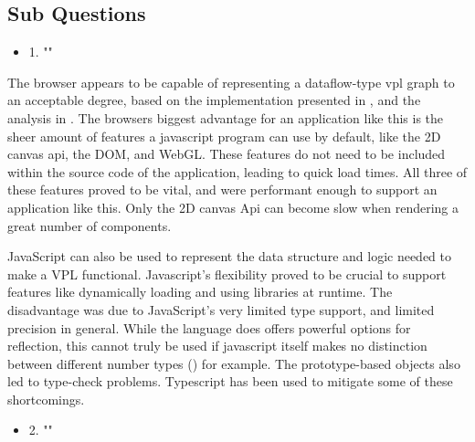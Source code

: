 \subsection*{Sub Questions}

\begin{itemize}[ ]
  \item 1. "\mySubRQOne"
\end{itemize}

The browser appears to be capable of representing a dataflow-type vpl graph to an acceptable degree, 
based on the implementation presented in , and the analysis in .
The browsers biggest advantage for an application like this is the sheer amount of features a javascript program can use by default, like the 2D canvas api, the DOM, and WebGL. 
These features do not need to be included within the source code of the application, leading to quick load times. 
All three of these features proved to be vital, and were performant enough to support an application like this. 
Only the 2D canvas Api can become slow when rendering a great number of components. 

JavaScript can also be used to represent the data structure and logic needed to make a VPL functional. 
Javascript's flexibility proved to be crucial to support features like dynamically loading and using libraries at runtime. 
The disadvantage was due to JavaScript's very limited type support, and limited precision in general. 
While the language does offers powerful options for reflection, this cannot truly be used if javascript itself makes no distinction between different number types () for example. 
The prototype-based objects also led to type-check problems. 
Typescript has been used to mitigate some of these shortcomings.  

\begin{itemize}[ ]
  \item 2. "\mySubRQTwo"
\end{itemize}


